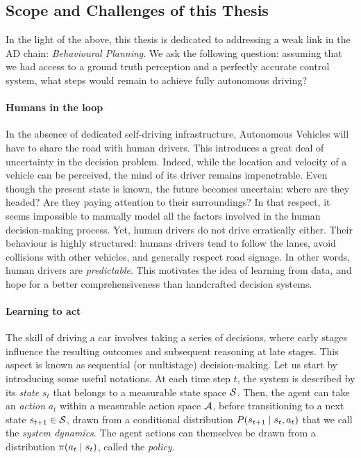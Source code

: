 \subsection{Scope and Challenges of this Thesis}
\label{sec:scopes-and-challenges}

In the light of the above, this thesis is dedicated to addressing a weak link in the \acl*{AD} chain: \emph{Behavioural Planning}.  We ask the following question: assuming that we had access to a ground truth perception and a perfectly accurate control system, what steps would remain to achieve fully autonomous driving?


\paragraph{Humans in the loop}

In the absence of dedicated self-driving infrastructure, Autonomous Vehicles will have to share the road with human drivers. This introduces a great deal of uncertainty in the decision problem. Indeed, while the location and velocity of a vehicle can be perceived, the mind of its driver remains impenetrable. Even though the present state is known, the future becomes uncertain: where are they headed? Are they paying attention to their surroundings? In that respect, it seems impossible to manually model all the factors involved in the human decision-making process. Yet, human drivers do not drive erratically either. Their behaviour is highly structured: humans drivers tend to follow the lanes, avoid collisions with other vehicles, and generally respect road signage. In other words, human drivers are \emph{predictable}. This motivates the idea of learning from data, and hope for a better comprehensiveness than handcrafted decision systems.%

\paragraph{Learning to act}

The skill of driving a car involves taking a series of decisions, where early stages influence the resulting outcomes and subsequent reasoning at late stages. This aspect is known as sequential (or multistage) decision-making. Let us start by introducing some useful notations. At each time step $t$, the system is described by its \emph{state} $s_t$ that belongs to a measurable state space $\mathcal{S}$. Then, the agent can take an \emph{action} $a_t$ within a measurable action space $\mathcal{A}$, before transitioning to a next state $s_{t+1}\in\mathcal{S}$, drawn from a conditional distribution $P\lparen s_{t+1} \mid s_t, a_t\rparen$ that we call the \emph{system dynamics}. The agent actions can themselves be drawn from a distribution $\pi\lparen a_t\mid s_t\rparen$, called the \emph{policy}.

